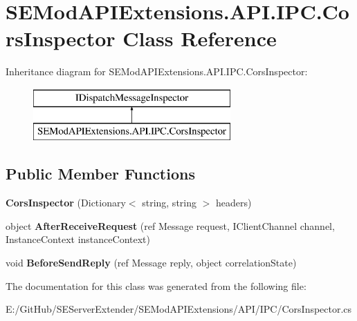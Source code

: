 \hypertarget{class_s_e_mod_a_p_i_extensions_1_1_a_p_i_1_1_i_p_c_1_1_cors_inspector}{}\section{S\+E\+Mod\+A\+P\+I\+Extensions.\+A\+P\+I.\+I\+P\+C.\+Cors\+Inspector Class Reference}
\label{class_s_e_mod_a_p_i_extensions_1_1_a_p_i_1_1_i_p_c_1_1_cors_inspector}
Inheritance diagram for S\+E\+Mod\+A\+P\+I\+Extensions.\+A\+P\+I.\+I\+P\+C.\+Cors\+Inspector\+:\begin{figure}[H]
\begin{center}
\leavevmode
\includegraphics[height=2.000000cm]{class_s_e_mod_a_p_i_extensions_1_1_a_p_i_1_1_i_p_c_1_1_cors_inspector}
\end{center}
\end{figure}
\subsection*{Public Member Functions}
\begin{DoxyCompactItemize}
\item 
\hypertarget{class_s_e_mod_a_p_i_extensions_1_1_a_p_i_1_1_i_p_c_1_1_cors_inspector_a2596eab797a3b58db8e19aee91484c01}{}{\bfseries Cors\+Inspector} (Dictionary$<$ string, string $>$ headers)\label{class_s_e_mod_a_p_i_extensions_1_1_a_p_i_1_1_i_p_c_1_1_cors_inspector_a2596eab797a3b58db8e19aee91484c01}

\item 
\hypertarget{class_s_e_mod_a_p_i_extensions_1_1_a_p_i_1_1_i_p_c_1_1_cors_inspector_a8a0f2ae76bb29f85b3d9a084d1913287}{}object {\bfseries After\+Receive\+Request} (ref Message request, I\+Client\+Channel channel, Instance\+Context instance\+Context)\label{class_s_e_mod_a_p_i_extensions_1_1_a_p_i_1_1_i_p_c_1_1_cors_inspector_a8a0f2ae76bb29f85b3d9a084d1913287}

\item 
\hypertarget{class_s_e_mod_a_p_i_extensions_1_1_a_p_i_1_1_i_p_c_1_1_cors_inspector_a2b35c6da5694a6bb60dfbc3daa236d06}{}void {\bfseries Before\+Send\+Reply} (ref Message reply, object correlation\+State)\label{class_s_e_mod_a_p_i_extensions_1_1_a_p_i_1_1_i_p_c_1_1_cors_inspector_a2b35c6da5694a6bb60dfbc3daa236d06}

\end{DoxyCompactItemize}


The documentation for this class was generated from the following file\+:\begin{DoxyCompactItemize}
\item 
E\+:/\+Git\+Hub/\+S\+E\+Server\+Extender/\+S\+E\+Mod\+A\+P\+I\+Extensions/\+A\+P\+I/\+I\+P\+C/Cors\+Inspector.\+cs\end{DoxyCompactItemize}
